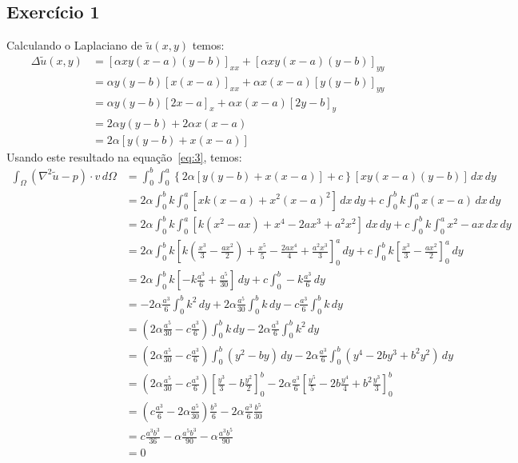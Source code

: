 \documentclass[10pt,a4paper]{article}
\begin{document}
	\subsection{Exercício 1}
	Calculando o Laplaciano de $\tilde{u}(x,y)$ temos:
	\begin{align*}
		\Delta \tilde{u}(x,y) &= \left[\alpha xy(x-a)(y-b)\right]_{xx} + \left[\alpha xy(x-a)(y-b)\right]_{yy}\\
		&= \alpha y(y-b) \left[x(x-a)\right]_{xx} + \alpha x(x-a)\left[y(y-b)\right]_{yy}\\
		&= \alpha y(y-b) \left[2x-a\right]_{x} + \alpha x(x-a)\left[2y-b\right]_{y}\\
		&= 2\alpha y(y-b) + 2\alpha x(x-a)\\
		&= 2\alpha \left[y(y-b) + x(x-a)\right]
	\end{align*}
	Usando este resultado na equação~\ref{eq:3}, temos:
	\begin{align*}
		\int_\Omega \left(\nabla^2\tilde{u}-p\right)\cdot v\,d\Omega &= \int_0^b \int_0^a \left\{2\alpha \left[y(y-b) + x(x-a)\right] + c\right\} \left[ xy(x-a)(y-b)\right] \,dx\,dy\\
		&= 2\alpha \int_0^b k \int_0^a \left[xk(x-a) + x^2(x-a)^2\right]\,dx\,dy + c\int_0^b k\int_0^a x(x-a)\,dx\,dy\\
		&= 2\alpha \int_0^b k \int_0^a \left[k(x^2-ax) + x^4-2ax^3+a^2x^2\right]\,dx\,dy + c\int_0^b k\int_0^a x^2-ax\,dx\,dy\\
		&= 2\alpha \int_0^b k \left[k\left(\frac{x^3}{3}-\frac{ax^2}{2}\right) + \frac{x^5}{5}-\frac{2ax^4}{4}+\frac{a^2x^3}{3}\right]_0^a\,dy + c\int_0^b k \left[\frac{x^3}{3}-\frac{ax^2}{2}\right]_0^a\,dy\\
		&= 2\alpha \int_0^b k \left[-k\frac{a^3}{6} + \frac{a^5}{30}\right]\,dy + c\int_0^b -k\frac{a^3}{6}\,dy\\
		&= -2\alpha \frac{a^3}{6} \int_0^b k^2\,dy + 2\alpha \frac{a^5}{30}\int_0^b k\,dy -c\frac{a^3}{6} \int_0^b k\,dy\\
		&= \left(2\alpha \frac{a^5}{30}-c\frac{a^3}{6}\right) \int_0^b k\,dy -2\alpha \frac{a^3}{6} \int_0^b k^2\,dy\\
		&= \left(2\alpha \frac{a^5}{30}-c\frac{a^3}{6}\right) \int_0^b (y^2-by)\,dy -2\alpha \frac{a^3}{6} \int_0^b (y^4-2by^3+b^2y^2)\,dy\\
		&= \left(2\alpha \frac{a^5}{30}-c\frac{a^3}{6}\right) \left[\frac{y^3}{3}-b\frac{y^2}{2}\right]_0^b -2\alpha \frac{a^3}{6} \left[\frac{y^5}{5}-2b\frac{y^4}{4}+b^2\frac{y^3}{3}\right]_0^b\\
		&= \left(c\frac{a^3}{6}-2\alpha \frac{a^5}{30}\right) \frac{b^3}{6} -2\alpha \frac{a^3}{6} \frac{b^5}{30}\\
		&= c\frac{a^3b^3}{36} -\alpha \frac{a^5b^3}{90} -\alpha \frac{a^3b^5}{90}\\
		&= 0
	\end{align*}
\end{document}

